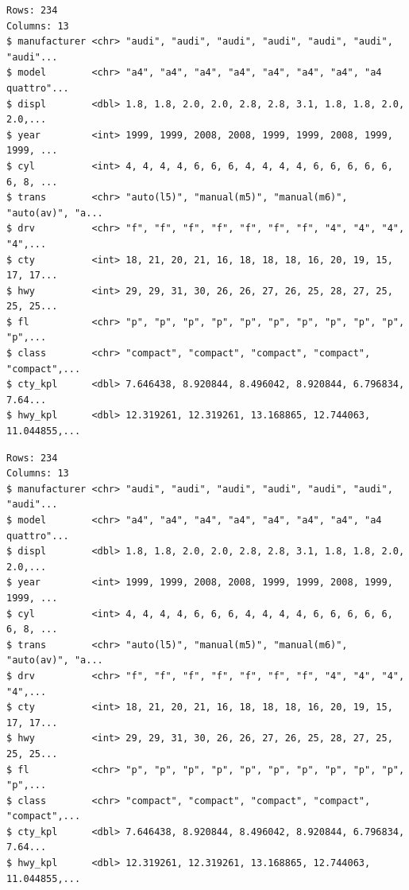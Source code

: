 \documentclass[
  11pt,
]{krantz}
\newenvironment{Shaded}{\begin{snugshade}}{\end{snugshade}}
\newcommand{\CommentTok}[1]{\textcolor[rgb]{0.37,0.37,0.37}{\textit{#1}}}
\newcommand{\DataTypeTok}[1]{\textcolor[rgb]{0.27,0.27,0.27}{#1}}
\newcommand{\KeywordTok}[1]{\textcolor[rgb]{0.27,0.27,0.27}{\textbf{#1}}}
\newcommand{\NormalTok}[1]{#1}
\newcommand{\OperatorTok}[1]{\textcolor[rgb]{0.43,0.43,0.43}{\textbf{#1}}}
\newcommand{\StringTok}[1]{\textcolor[rgb]{0.5,0.5,0.5}{#1}}
\begin{document}
\begin{verbatim}
Rows: 234
Columns: 13
$ manufacturer <chr> "audi", "audi", "audi", "audi", "audi", "audi", "audi"...
$ model        <chr> "a4", "a4", "a4", "a4", "a4", "a4", "a4", "a4 quattro"...
$ displ        <dbl> 1.8, 1.8, 2.0, 2.0, 2.8, 2.8, 3.1, 1.8, 1.8, 2.0, 2.0,...
$ year         <int> 1999, 1999, 2008, 2008, 1999, 1999, 2008, 1999, 1999, ...
$ cyl          <int> 4, 4, 4, 4, 6, 6, 6, 4, 4, 4, 4, 6, 6, 6, 6, 6, 6, 8, ...
$ trans        <chr> "auto(l5)", "manual(m5)", "manual(m6)", "auto(av)", "a...
$ drv          <chr> "f", "f", "f", "f", "f", "f", "f", "4", "4", "4", "4",...
$ cty          <int> 18, 21, 20, 21, 16, 18, 18, 18, 16, 20, 19, 15, 17, 17...
$ hwy          <int> 29, 29, 31, 30, 26, 26, 27, 26, 25, 28, 27, 25, 25, 25...
$ fl           <chr> "p", "p", "p", "p", "p", "p", "p", "p", "p", "p", "p",...
$ class        <chr> "compact", "compact", "compact", "compact", "compact",...
$ cty_kpl      <dbl> 7.646438, 8.920844, 8.496042, 8.920844, 6.796834, 7.64...
$ hwy_kpl      <dbl> 12.319261, 12.319261, 13.168865, 12.744063, 11.044855,...
\end{verbatim}

\begin{Shaded}
\end{Shaded}

\begin{verbatim}
Rows: 234
Columns: 13
$ manufacturer <chr> "audi", "audi", "audi", "audi", "audi", "audi", "audi"...
$ model        <chr> "a4", "a4", "a4", "a4", "a4", "a4", "a4", "a4 quattro"...
$ displ        <dbl> 1.8, 1.8, 2.0, 2.0, 2.8, 2.8, 3.1, 1.8, 1.8, 2.0, 2.0,...
$ year         <int> 1999, 1999, 2008, 2008, 1999, 1999, 2008, 1999, 1999, ...
$ cyl          <int> 4, 4, 4, 4, 6, 6, 6, 4, 4, 4, 4, 6, 6, 6, 6, 6, 6, 8, ...
$ trans        <chr> "auto(l5)", "manual(m5)", "manual(m6)", "auto(av)", "a...
$ drv          <chr> "f", "f", "f", "f", "f", "f", "f", "4", "4", "4", "4",...
$ cty          <int> 18, 21, 20, 21, 16, 18, 18, 18, 16, 20, 19, 15, 17, 17...
$ hwy          <int> 29, 29, 31, 30, 26, 26, 27, 26, 25, 28, 27, 25, 25, 25...
$ fl           <chr> "p", "p", "p", "p", "p", "p", "p", "p", "p", "p", "p",...
$ class        <chr> "compact", "compact", "compact", "compact", "compact",...
$ cty_kpl      <dbl> 7.646438, 8.920844, 8.496042, 8.920844, 6.796834, 7.64...
$ hwy_kpl      <dbl> 12.319261, 12.319261, 13.168865, 12.744063, 11.044855,...
\end{verbatim}
\end{document}

